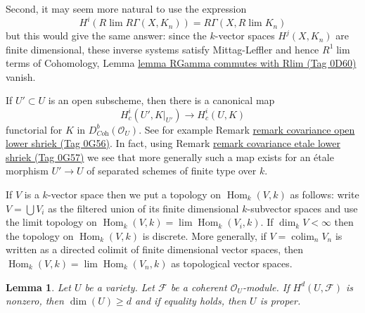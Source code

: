 \documentclass{amsart}
\theoremstyle{plain}
\newtheorem{lemma}[subsection]{Lemma}
\theoremstyle{definition}
\theoremstyle{remark}
\numberwithin{equation}{subsection}
\def\lim{\mathop{\mathrm{lim}}\nolimits}
\def\colim{\mathop{\mathrm{colim}}\nolimits}
\def\Hom{\mathop{\mathrm{Hom}}\nolimits}
\begin{document}
\medskip\noindent
Second, it may seem more natural to use the expression
$$
H^i(R\lim R\Gamma(X, K_n)) = R\Gamma(X, R\lim K_n)
$$
but this would give the same answer: since the $k$-vector spaces
$H^j(X, K_n)$ are finite dimensional, these inverse systems satisfy
Mittag-Leffler and hence $R^1\lim$ terms of Cohomology, Lemma
\href{https://stacks.math.columbia.edu/tag/0D60}{lemma RGamma commutes with Rlim (Tag 0D60)} vanish.

\medskip\noindent
If $U' \subset U$ is an open subscheme, then there is a canonical map
$$
H^i_c(U', K|_{U'}) \longrightarrow H^i_c(U, K)
$$
functorial for $K$ in $D^b_{\textit{Coh}}(\mathcal{O}_U)$.
See for example Remark \href{https://stacks.math.columbia.edu/tag/0G56}{remark covariance open lower shriek (Tag 0G56)}.
In fact, using Remark \href{https://stacks.math.columbia.edu/tag/0G57}{remark covariance etale lower shriek (Tag 0G57)}
we see that more generally such a map exists for an \'etale morphism
$U' \to U$ of separated schemes of finite type over $k$.

\medskip\noindent
If $V$ is a $k$-vector space then we put a topology on $\Hom_k(V, k)$
as follows: write $V = \bigcup V_i$ as the filtered union of its finite
dimensional $k$-subvector spaces and use the limit topology on
$\Hom_k(V, k) = \lim \Hom_k(V_i, k)$. If $\dim_k V < \infty$ then
the topology on $\Hom_k(V, k)$ is discrete. More generally, if
$V = \colim_n V_n$ is written as a directed colimit of finite dimensional
vector spaces, then $\Hom_k(V, k) = \lim \Hom_k(V_n, k)$ as topological
vector spaces.



\begin{lemma}
\label{lemma-lichtenbaum}
Let $U$ be a variety. Let $\mathcal{F}$ be a coherent $\mathcal{O}_U$-module.
If $H^d(U, \mathcal{F})$ is nonzero, then $\dim(U) \geq d$ and if
equality holds, then $U$ is proper.
\end{lemma}
\end{document}
